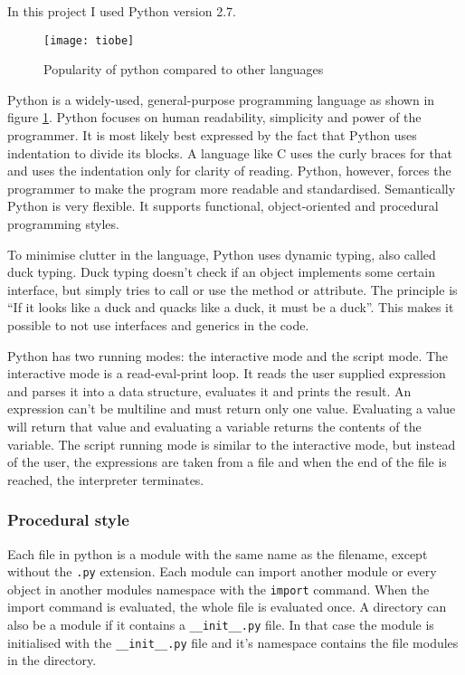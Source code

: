 In this project I used Python version 2.7.

\begin{figure}[htp]
\begin{center}
  \texttt{[image: tiobe]}
  \caption[Python popularity]{Popularity of python compared to other languages}
  \label{python-popularity}
\end{center}
\end{figure}

Python is a widely-used, general-purpose programming language as shown in
figure \ref{python-popularity}.
Python focuses on human readability, simplicity and power of the programmer. It is most likely
best expressed by the fact that Python uses indentation to divide its blocks. A
language like C uses the curly braces for that and uses the indentation only for
clarity of reading. Python, however, forces the programmer to make the program
more readable and standardised. Semantically Python is very flexible. It
supports functional, object-oriented and procedural programming styles.

To minimise clutter in the language, Python uses dynamic typing, also called
duck typing. Duck typing doesn't check if an object implements some certain
interface, but simply tries to call or use the method or attribute. The
principle is ``If it looks like a duck and quacks like a duck, it must be a
duck''.\cite[duck-typing]{python-glossary} This makes it possible to not use
interfaces and generics in the code.

Python has two running modes: the interactive mode and the script mode. The
interactive mode is a read-eval-print loop. It reads the user supplied
expression and parses it into a data structure, evaluates it and prints the
result. An expression can't be multiline and must return only one value.
Evaluating a value will return that value and evaluating a variable returns the
contents of the variable. The script running mode is similar to the interactive
mode, but instead of the user, the expressions are taken from a file and when
the end of the file is reached, the interpreter terminates.

\subsubsection{Procedural style}
Each file in python is a module with the same name as the filename, except without the \texttt{.py} extension. Each module can import another module or every object in another modules namespace with the \texttt{import} command. When the import command is evaluated, the whole file is evaluated once. A directory can also be a module if it contains a \texttt{\_\_init\_\_.py} file. In that case the module is initialised with the \texttt{\_\_init\_\_.py} file and it's namespace contains the file modules in the directory.

